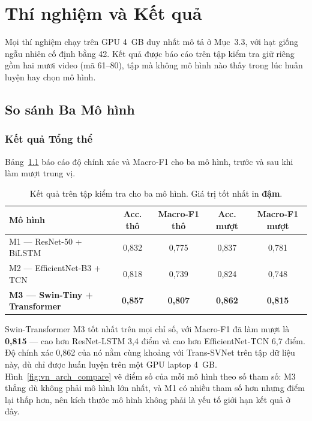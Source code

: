 \chapter{Thí nghiệm và Kết quả}

Mọi thí nghiệm chạy trên GPU 4~GB duy nhất mô tả ở Mục~3.3, với hạt giống ngẫu nhiên cố định bằng 42. Kết quả được báo cáo trên tập kiểm tra giữ riêng gồm hai mươi video (mã 61--80), tập mà không mô hình nào thấy trong lúc huấn luyện hay chọn mô hình.

\section{So sánh Ba Mô hình}

\subsection{Kết quả Tổng thể}

Bảng~\ref{tab:vn_model_comparison} báo cáo độ chính xác và Macro-F1 cho ba mô hình, trước và sau khi làm mượt trung vị.

\begin{table}[H]
\centering
\caption{Kết quả trên tập kiểm tra cho ba mô hình. Giá trị tốt nhất in \textbf{đậm}.}
\label{tab:vn_model_comparison}
\begin{tabular}{lcccc}
\toprule
\textbf{Mô hình} & \textbf{Acc. thô} & \textbf{Macro-F1 thô} & \textbf{Acc. mượt} & \textbf{Macro-F1 mượt} \\
\midrule
M1 --- ResNet-50 + BiLSTM      & 0,832 & 0,775 & 0,837 & 0,781 \\
M2 --- EfficientNet-B3 + TCN   & 0,818 & 0,739 & 0,824 & 0,748 \\
\textbf{M3 --- Swin-Tiny + Transformer} & \textbf{0,857} & \textbf{0,807} & \textbf{0,862} & \textbf{0,815} \\
\bottomrule
\end{tabular}
\end{table}

Swin-Transformer M3 tốt nhất trên mọi chỉ số, với Macro-F1 đã làm mượt là \textbf{0,815} --- cao hơn ResNet-LSTM 3,4 điểm và cao hơn EfficientNet-TCN 6,7 điểm. Độ chính xác 0,862 của nó nằm cùng khoảng với Trans-SVNet trên tập dữ liệu này, dù chỉ được huấn luyện trên một GPU laptop 4~GB. Hình~\ref{fig:vn_arch_compare} vẽ điểm số của mỗi mô hình theo số tham số: M3 thắng dù không phải mô hình lớn nhất, và M1 có nhiều tham số hơn nhưng điểm lại thấp hơn, nên kích thước mô hình không phải là yếu tố giới hạn kết quả ở đây.

